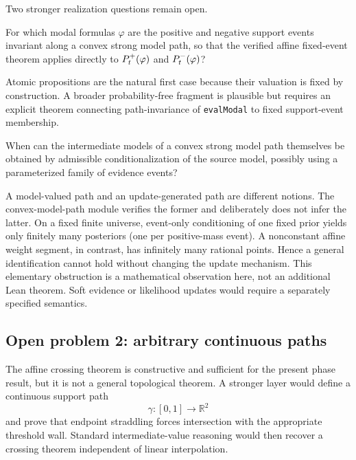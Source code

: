 Two stronger realization questions remain open.

\begin{question}
For which modal formulas \(\varphi\) are the positive and negative support events invariant along a convex strong model path, so that the verified affine fixed-event theorem applies directly to \(P^{+}_t(\varphi)\) and \(P^{-}_t(\varphi)\)?
\end{question}

Atomic propositions are the natural first case because their valuation is fixed by construction. A broader probability-free fragment is plausible but requires an explicit theorem connecting path-invariance of \texttt{evalModal} to fixed support-event membership.

\begin{question}
When can the intermediate models of a convex strong model path themselves be obtained by admissible conditionalization of the source model, possibly using a parameterized family of evidence events?
\end{question}

A model-valued path and an update-generated path are different notions. The
convex-model-path module verifies the former and deliberately does not infer
the latter. On a fixed finite universe, event-only conditioning of one fixed
prior yields only finitely many posteriors (one per positive-mass event).
A nonconstant affine weight segment, in contrast, has infinitely many rational
points. Hence a general identification cannot hold without changing the update
mechanism. This elementary obstruction is a mathematical observation here,
not an additional Lean theorem. Soft evidence or likelihood updates would
require a separately specified semantics.

\subsection{Open problem 2: arbitrary continuous paths}

The affine crossing theorem is constructive and sufficient for the present phase result, but it is not a general topological theorem. A stronger layer would define a continuous support path
\[
  \gamma:[0,1]\to\mathbb{R}^2
\]
and prove that endpoint straddling forces intersection with the appropriate threshold wall. Standard intermediate-value reasoning would then recover a crossing theorem independent of linear interpolation.

